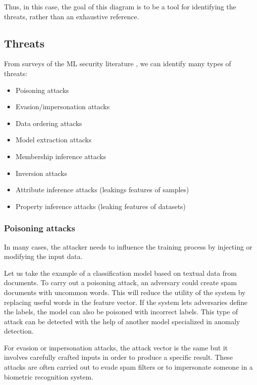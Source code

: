 \documentclass[a4paper,11pt,oneside]{report}
\begin{document}
Thus, in this case, the goal of this diagram is to be a tool for identifying the threats, rather than an exhaustive reference.

\subsection{Threats}\label{sec:threats}

From surveys of the ML security literature \cite{liu_survey_2018, rigaki_survey_2021}, we can identify many types of threats:

\begin{itemize}
    \item Poisoning attacks
    \item Evasion/impersonation attacks
    \item Data ordering attacks
    \item Model extraction attacks
    \item Membership inference attacks
    \item Inversion attacks
    \item Attribute inference attacks (leakings features of samples)
    \item Property inference attacks (leaking features of datasets)
\end{itemize}

\subsubsection{Poisoning attacks}

In many cases, the attacker needs to influence the training process by injecting or modifying the input data.

Let us take the example of a classification model based on textual data from documents. 
To carry out a poisoning attack, an adversary could create spam documents with uncommon words. 
This will reduce the utility of the system by replacing useful words in the feature vector. 
If the system lets adversaries define the labels, the model can also be poisoned with incorrect labels. 
This type of attack can be detected with the help of another model specialized in anomaly detection.

For evasion or impersonation attacks, the attack vector is the same but it involves carefully crafted inputs in order to produce a specific result. 
These attacks are often carried out to evade spam filters or to impersonate someone in a biometric recognition system.
\end{document}
